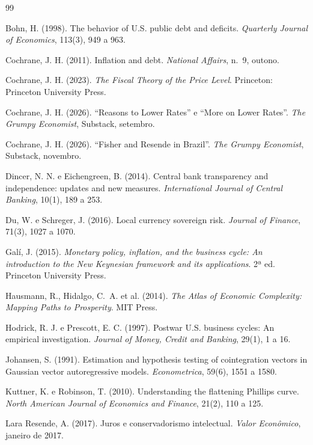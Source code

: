 \documentclass[11pt,a4paper]{article}
\begin{document}
\renewcommand{\refname}{Referências}
\begin{thebibliography}{99}

Bohn, H. (1998). The behavior of U.S. public debt and deficits.
\emph{Quarterly Journal of Economics}, 113(3), 949 a 963.

Cochrane, J. H. (2011). Inflation and debt. \emph{National Affairs}, n.~9,
outono.

Cochrane, J. H. (2023). \emph{The Fiscal Theory of the Price Level}.
Princeton: Princeton University Press.

Cochrane, J. H. (2026). ``Reasons to Lower Rates'' e ``More on Lower
Rates''. \emph{The Grumpy Economist}, Substack, setembro.

Cochrane, J. H. (2026). ``Fisher and Resende in Brazil''. \emph{The Grumpy
Economist}, Substack, novembro.

Dincer, N. N. e Eichengreen, B. (2014). Central bank transparency and
independence: updates and new measures. \emph{International Journal of
Central Banking}, 10(1), 189 a 253.

Du, W. e Schreger, J. (2016). Local currency sovereign risk.
\emph{Journal of Finance}, 71(3), 1027 a 1070.

Galí, J. (2015). \emph{Monetary policy, inflation, and the business cycle:
An introduction to the New Keynesian framework and its applications}. 2ª
ed. Princeton University Press.

Hausmann, R., Hidalgo, C.~A. et al. (2014). \emph{The Atlas of Economic
Complexity: Mapping Paths to Prosperity}. MIT Press.

Hodrick, R. J. e Prescott, E. C. (1997). Postwar U.S. business cycles:
An empirical investigation. \emph{Journal of Money, Credit and Banking},
29(1), 1 a 16.

Johansen, S. (1991). Estimation and hypothesis testing of cointegration
vectors in Gaussian vector autoregressive models. \emph{Econometrica},
59(6), 1551 a 1580.

Kuttner, K. e Robinson, T. (2010). Understanding the flattening Phillips
curve. \emph{North American Journal of Economics and Finance}, 21(2),
110 a 125.

Lara Resende, A. (2017). Juros e conservadorismo intelectual.
\emph{Valor Econômico}, janeiro de 2017.


\end{thebibliography}
\end{document}
